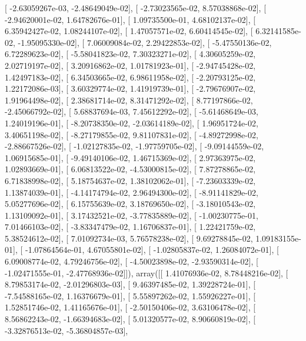 \documentclass{article}
\begin{document}
       [ -2.63059267e-03,  -2.48649049e-02],
       [ -2.73023565e-02,   8.57038868e-02],
       [ -2.94620001e-02,   1.64782676e-01],
       [  1.09735500e-01,   4.68102137e-02],
       [  6.35942427e-02,   1.08244107e-02],
       [  1.47057571e-02,   6.60414545e-02],
       [  6.32141585e-02,  -1.95095330e-02],
       [  7.06009084e-02,   2.29422853e-02],
       [ -5.47550136e-02,   6.72289623e-02],
       [ -5.58041823e-02,   7.30323271e-02],
       [  4.30605259e-02,   2.02719197e-02],
       [  3.20916862e-02,   1.01781923e-01],
       [ -2.94745428e-02,   1.42497183e-02],
       [  6.34503665e-02,   6.98611958e-02],
       [ -2.20793125e-02,   1.22172086e-03],
       [  3.60329774e-02,   1.41919739e-01],
       [ -2.79676907e-02,   1.91964498e-02],
       [  2.38681714e-02,   8.31471292e-02],
       [  8.77197866e-02,  -2.45066792e-02],
       [  5.68837694e-03,   7.45612292e-02],
       [ -5.61468649e-03,   1.24019196e-01],
       [ -8.20738350e-02,  -2.03614189e-02],
       [  1.96951724e-02,   3.40651198e-02],
       [ -8.27179855e-02,   9.81107831e-02],
       [ -4.89272998e-02,  -2.88667526e-02],
       [ -1.02127835e-02,  -1.97759705e-02],
       [ -9.09144559e-02,   1.06915685e-01],
       [ -9.49140106e-02,   1.46715369e-02],
       [  2.97363975e-02,   1.02893669e-01],
       [  6.06813522e-02,  -4.53000815e-02],
       [  7.87278865e-02,   6.71838998e-02],
       [  5.18754637e-02,   1.38102062e-01],
       [ -7.23603339e-02,   1.13874039e-01],
       [ -4.14174794e-02,   2.96494300e-02],
       [ -8.91141829e-02,   5.05277696e-02],
       [  6.15755639e-02,   3.18769650e-02],
       [ -3.18010543e-02,   1.13109092e-01],
       [  3.17432521e-02,  -3.77835889e-02],
       [ -1.00230775e-01,   7.01466103e-02],
       [ -3.83347479e-02,   1.16706837e-01],
       [  1.22421759e-02,   5.38524612e-02],
       [  7.01092734e-03,   5.76578238e-02],
       [  9.69278845e-02,   1.09183155e-01],
       [ -1.07864564e-01,   4.67055801e-02],
       [ -1.02805837e-02,   1.26084072e-01],
       [  6.09008774e-02,   4.79246756e-02],
       [ -4.50023898e-02,  -2.93590314e-02],
       [ -1.02471555e-01,  -2.47768936e-02]]), array([[  1.41076936e-02,   8.78448216e-02],
       [  8.79853174e-02,  -2.01296803e-03],
       [  9.46397485e-02,   1.39228724e-01],
       [ -7.54588165e-02,   1.16376679e-01],
       [  5.55897262e-02,   1.55926227e-01],
       [  1.52851746e-02,   1.41165676e-01],
       [ -2.50150406e-02,   3.63106478e-02],
       [  8.56862243e-02,  -1.66394683e-02],
       [  5.01320577e-02,   8.90660819e-02],
       [ -3.32876513e-02,  -5.36804857e-03],
\end{document}
